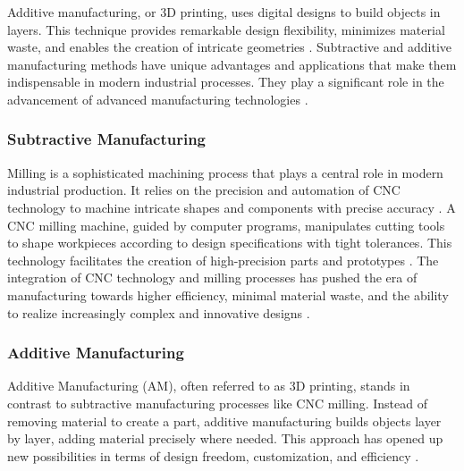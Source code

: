 \documentclass[ZLstudentexpose%
              ,optBiber%
              ,optEnglish%
              ,10pt
              ]{ZLlatex}%
\begin{document}
Additive manufacturing, or 3D printing, uses digital designs to build objects in layers. This technique provides remarkable design flexibility, minimizes material waste, and enables the creation of intricate geometries \cite{Dilberoglu.2017}. Subtractive and additive manufacturing methods have unique advantages and applications that make them indispensable in modern industrial processes. They play a significant role in the advancement of advanced manufacturing technologies \cite{Bandyopadhyay.2020, vanLe.2017}.



\subsubsection{Subtractive Manufacturing}
Milling is a sophisticated machining process that plays a central role in modern industrial production. It relies on the precision and automation of CNC technology to machine intricate shapes and components with precise accuracy \cite{Jayawardane.2023}. A CNC milling machine, guided by computer programs, manipulates cutting tools to shape workpieces according to design specifications with tight tolerances. This technology facilitates the creation of high-precision parts and prototypes \cite{Amanullah.2017}. The integration of CNC technology and milling processes has pushed the era of manufacturing towards higher efficiency, minimal material waste, and the ability to realize increasingly complex and innovative designs \cite{Wang.2023}.
\newpage
\subsubsection{Additive Manufacturing}
Additive Manufacturing (AM), often referred to as 3D printing, stands in contrast to subtractive manufacturing processes like CNC milling. Instead of removing material to create a part, additive manufacturing builds objects layer by layer, adding material precisely where needed. This approach has opened up new possibilities in terms of design freedom, customization, and efficiency \cite{Prakash.2018}.
\end{document}
